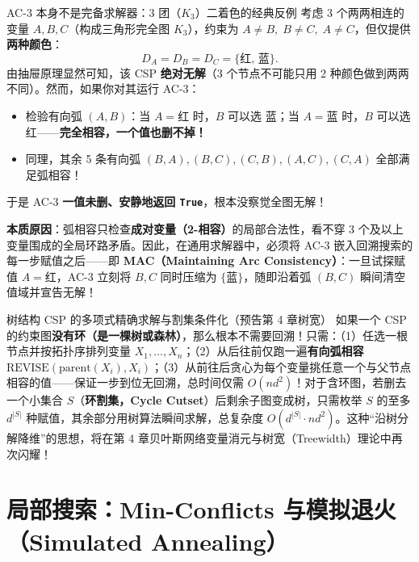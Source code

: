 \begin{failBox}{AC-3 本身不是完备求解器：3 团（$K_3$）二着色的经典反例}
考虑 3 个两两相连的变量 $A, B, C$（构成三角形完全图 $K_3$），约束为 $A\neq B,\; B\neq C,\; A\neq C$，但仅提供\textbf{两种颜色}：
\[
  D_A = D_B = D_C = \{\text{红},\, \text{蓝}\}.
\]
由抽屉原理显然可知，该 CSP \textbf{绝对无解}（3 个节点不可能只用 2 种颜色做到两两不同）。然而，如果你对其运行 AC-3：
\begin{itemize}
  \item 检验有向弧 $(A, B)$：当 $A=\text{红}$ 时，$B$ 可以选 $\text{蓝}$；当 $A=\text{蓝}$ 时，$B$ 可以选 $\text{红}$——\textbf{完全相容，一个值也删不掉！}
  \item 同理，其余 5 条有向弧 $(B,A),(B,C),(C,B),(A,C),(C,A)$ 全部满足弧相容！
\end{itemize}
于是 AC-3 \textbf{一值未删、安静地返回 \texttt{True}}，根本没察觉全图无解！

\textbf{本质原因}：弧相容只检查\textbf{成对变量（2-相容）}的局部合法性，看不穿 3 个及以上变量围成的全局环路矛盾。因此，在通用求解器中，必须将 AC-3 嵌入回溯搜索的每一步赋值之后——即 \textbf{MAC（Maintaining Arc Consistency）}：一旦试探赋值 $A=\text{红}$，AC-3 立刻将 $B, C$ 同时压缩为 $\{\text{蓝}\}$，随即沿着弧 $(B,C)$ 瞬间清空值域并宣告无解！
\end{failBox}

\begin{extBox}{树结构 CSP 的多项式精确求解与割集条件化（预告第 4 章树宽）}
如果一个 CSP 的约束图\textbf{没有环（是一棵树或森林）}，那么根本不需要回溯！只需：（1）任选一根节点并按拓扑序排列变量 $X_1,\dots,X_n$；（2）从后往前仅跑一遍\textbf{有向弧相容} $\mathrm{REVISE}(\text{parent}(X_i), X_i)$；（3）从前往后贪心为每个变量挑任意一个与父节点相容的值——保证一步到位无回溯，总时间仅需 $O(n d^2)$！对于含环图，若删去一个小集合 $S$（\textbf{环割集，Cycle Cutset}）后剩余子图变成树，只需枚举 $S$ 的至多 $d^{|S|}$ 种赋值，其余部分用树算法瞬间求解，总复杂度 $O(d^{|S|}\cdot n d^2)$。这种“沿树分解降维”的思想，将在第 4 章贝叶斯网络变量消元与树宽（Treewidth）理论中再次闪耀！
\end{extBox}

\section{局部搜索：Min-Conflicts 与模拟退火（Simulated Annealing）}\label{sec:local-search}

